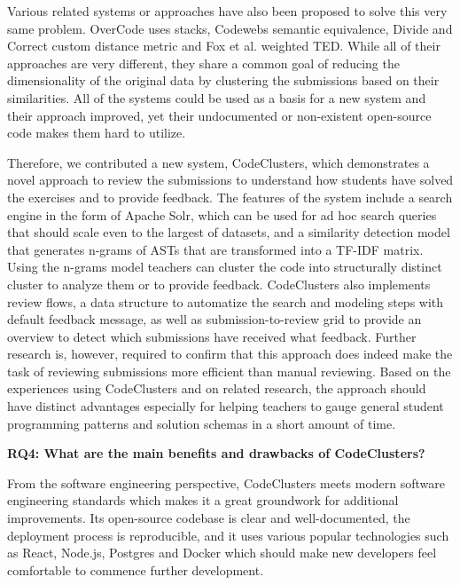 Various related systems or approaches have also been proposed to solve this very same problem. OverCode uses stacks\cite{overcode}, Codewebs semantic equivalence\cite{codewebs}, Divide and Correct custom distance metric\cite{divide-and-correct} and Fox et al. weighted TED\cite{fox-clust-leverage-2015}. While all of their approaches are very different, they share a common goal of reducing the dimensionality of the original data by clustering the submissions based on their similarities. All of the systems could be used as a basis for a new system and their approach improved, yet their undocumented or non-existent open-source code makes them hard to utilize.

Therefore, we contributed a new system, CodeClusters, which demonstrates a novel approach to review the submissions to understand how students have solved the exercises and to provide feedback. The features of the system include a search engine in the form of Apache Solr, which can be used for ad hoc search queries that should scale even to the largest of datasets, and a similarity detection model that generates n-grams of ASTs that are transformed into a TF-IDF matrix. Using the n-grams model teachers can cluster the code into structurally distinct cluster to analyze them or to provide feedback. CodeClusters also implements review flows, a data structure to automatize the search and modeling steps with default feedback message, as well as submission-to-review grid to provide an overview to detect which submissions have received what feedback. Further research is, however, required to confirm that this approach does indeed make the task of reviewing submissions more efficient than manual reviewing. Based on the experiences using CodeClusters and on related research, the approach should have distinct advantages especially for helping teachers to gauge general student programming patterns and solution schemas in a short amount of time.

\bigskip
\noindent
\textbf{RQ4: What are the main benefits and drawbacks of CodeClusters?}
\bigskip

\noindent
From the software engineering perspective, CodeClusters meets modern software engineering standards which makes it a great groundwork for additional improvements. Its open-source codebase is clear and well-documented, the deployment process is reproducible, and it uses various popular technologies such as React, Node.js, Postgres and Docker which should make new developers feel comfortable to commence further development.

